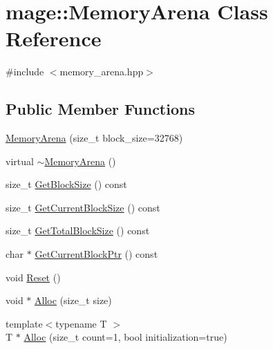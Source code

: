 \hypertarget{classmage_1_1_memory_arena}{}\section{mage\+:\+:Memory\+Arena Class Reference}
\label{classmage_1_1_memory_arena}


{\ttfamily \#include $<$memory\+\_\+arena.\+hpp$>$}

\subsection*{Public Member Functions}
\begin{DoxyCompactItemize}
\item 
\hyperlink{classmage_1_1_memory_arena_ac90beb8cf8dc42944a0fd6a4a9e8355c}{Memory\+Arena} (size\+\_\+t block\+\_\+size=32768)
\item 
virtual \hyperlink{classmage_1_1_memory_arena_acfee6fc205e2eaf6aeef4acf19948e6e}{$\sim$\+Memory\+Arena} ()
\item 
size\+\_\+t \hyperlink{classmage_1_1_memory_arena_a0db28bd286a517a30acdc061ace0bf56}{Get\+Block\+Size} () const
\item 
size\+\_\+t \hyperlink{classmage_1_1_memory_arena_a2789bf0c58dee881662bbb0c5ba73e55}{Get\+Current\+Block\+Size} () const
\item 
size\+\_\+t \hyperlink{classmage_1_1_memory_arena_ac4be7fb4d5623d6f78b1576c7884883a}{Get\+Total\+Block\+Size} () const
\item 
char $\ast$ \hyperlink{classmage_1_1_memory_arena_ac856206614ef9890d500df207d12e863}{Get\+Current\+Block\+Ptr} () const
\item 
void \hyperlink{classmage_1_1_memory_arena_a117b74c7bd5dfb28dfdaae6cab253491}{Reset} ()
\item 
void $\ast$ \hyperlink{classmage_1_1_memory_arena_a2e63b11c535dbfefd69d071466be9ce1}{Alloc} (size\+\_\+t size)
\item 
{\footnotesize template$<$typename T $>$ }\\T $\ast$ \hyperlink{classmage_1_1_memory_arena_ab249fe48cdf7c46f625050fe9583603a}{Alloc} (size\+\_\+t count=1, bool initialization=true)
\end{DoxyCompactItemize}
